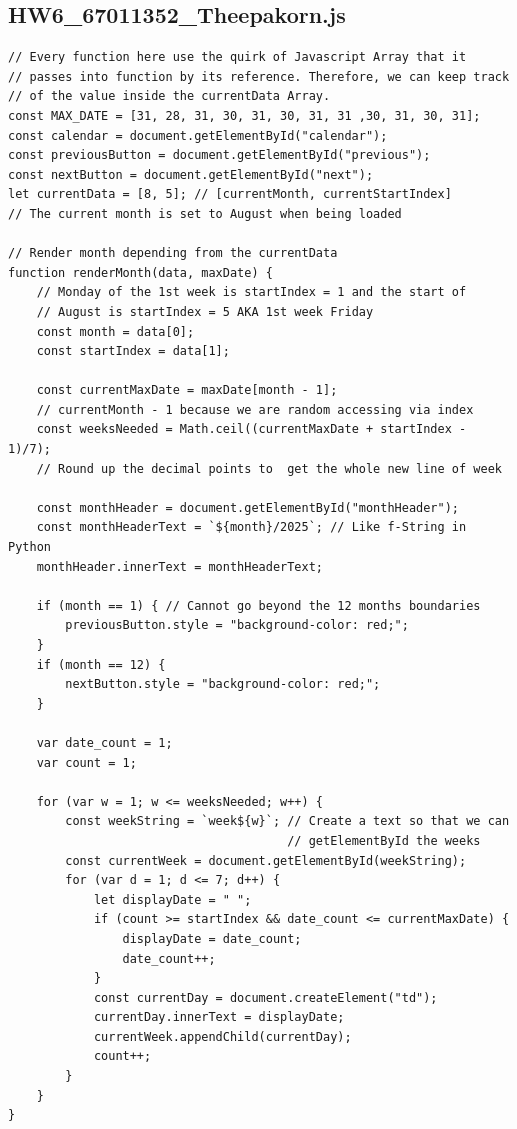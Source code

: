 \documentclass[12pt]{report} %
\begin{document}
\newpage

\subsection*{HW6\_67011352\_Theepakorn.js}

\begin{verbatim}
// Every function here use the quirk of Javascript Array that it
// passes into function by its reference. Therefore, we can keep track
// of the value inside the currentData Array.
const MAX_DATE = [31, 28, 31, 30, 31, 30, 31, 31 ,30, 31, 30, 31];
const calendar = document.getElementById("calendar");
const previousButton = document.getElementById("previous");
const nextButton = document.getElementById("next");
let currentData = [8, 5]; // [currentMonth, currentStartIndex]
// The current month is set to August when being loaded

// Render month depending from the currentData
function renderMonth(data, maxDate) {
    // Monday of the 1st week is startIndex = 1 and the start of
    // August is startIndex = 5 AKA 1st week Friday
    const month = data[0];
    const startIndex = data[1];

    const currentMaxDate = maxDate[month - 1];
    // currentMonth - 1 because we are random accessing via index
    const weeksNeeded = Math.ceil((currentMaxDate + startIndex - 1)/7);
    // Round up the decimal points to  get the whole new line of week

    const monthHeader = document.getElementById("monthHeader");
    const monthHeaderText = `${month}/2025`; // Like f-String in Python
    monthHeader.innerText = monthHeaderText;

    if (month == 1) { // Cannot go beyond the 12 months boundaries
        previousButton.style = "background-color: red;";
    }
    if (month == 12) {
        nextButton.style = "background-color: red;";
    }

    var date_count = 1;
    var count = 1;

    for (var w = 1; w <= weeksNeeded; w++) {
        const weekString = `week${w}`; // Create a text so that we can
                                       // getElementById the weeks
        const currentWeek = document.getElementById(weekString);
        for (var d = 1; d <= 7; d++) {
            let displayDate = " ";
            if (count >= startIndex && date_count <= currentMaxDate) {
                displayDate = date_count;
                date_count++;
            }
            const currentDay = document.createElement("td");
            currentDay.innerText = displayDate;
            currentWeek.appendChild(currentDay);
            count++;
        }
    }
}


\end{verbatim}
\end{document}
